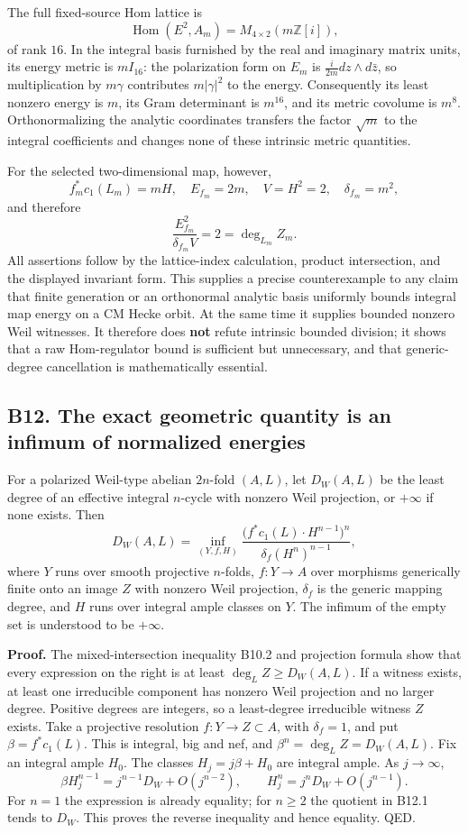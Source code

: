 The full fixed-source Hom lattice is \[
 \operatorname{Hom}(E^2,A_m)=M_{4\times2}(m\mathbb Z[i]),
\] of rank \(16\). In the integral basis furnished by the real and imaginary matrix units, its energy metric is \(m I_{16}\): the polarization form on \(E_m\) is \(\frac{i}{2m}dz\wedge d\bar z\), so multiplication by \(m\gamma\) contributes \(m|\gamma|^2\) to the energy. Consequently its least nonzero energy is \(m\), its Gram determinant is \(m^{16}\), and its metric covolume is \(m^8\). Orthonormalizing the analytic coordinates transfers the factor \(\sqrt m\) to the integral coefficients and changes none of these intrinsic metric quantities.

For the selected two-dimensional map, however, \[
 f_m^*c_1(L_m)=mH,\quad
 E_{f_m}=2m,\quad V=H^2=2,\quad \delta_{f_m}=m^2,
\] and therefore \[
 \frac{E_{f_m}^2}{\delta_{f_m}V}=2=\deg_{L_m}Z_m.
\] All assertions follow by the lattice-index calculation, product intersection, and the displayed invariant form. This supplies a precise counterexample to any claim that finite generation or an orthonormal analytic basis uniformly bounds integral map energy on a CM Hecke orbit. At the same time it supplies bounded nonzero Weil witnesses. It therefore does \textbf{not} refute intrinsic bounded division; it shows that a raw Hom-regulator bound is sufficient but unnecessary, and that generic-degree cancellation is mathematically essential.

\subsection{B12. The exact geometric quantity is an infimum of normalized energies}\label{b12.-the-exact-geometric-quantity-is-an-infimum-of-normalized-energies}

For a polarized Weil-type abelian \(2n\)-fold \((A,L)\), let \(D_W(A,L)\) be the least degree of an effective integral \(n\)-cycle with nonzero Weil projection, or \(+\infty\) if none exists. Then \[
 D_W(A,L)=\inf_{(Y,f,H)}
 \frac{\bigl(f^*c_1(L)\cdot H^{n-1}\bigr)^n}
 {\delta_f (H^n)^{n-1}},
\tag{B12.1}
\] where \(Y\) runs over smooth projective \(n\)-folds, \(f:Y\to A\) over morphisms generically finite onto an image \(Z\) with nonzero Weil projection, \(\delta_f\) is the generic mapping degree, and \(H\) runs over integral ample classes on \(Y\). The infimum of the empty set is understood to be \(+\infty\).

\textbf{Proof.} The mixed-intersection inequality B10.2 and projection formula show that every expression on the right is at least \(\deg_L Z\ge D_W(A,L)\). If a witness exists, at least one irreducible component has nonzero Weil projection and no larger degree. Positive degrees are integers, so a least-degree irreducible witness \(Z\) exists. Take a projective resolution \(f:Y\to Z\subset A\), with \(\delta_f=1\), and put \(\beta=f^*c_1(L)\). This is integral, big and nef, and \(\beta^n=\deg_L Z=D_W(A,L)\). Fix an integral ample \(H_0\). The classes \(H_j=j\beta+H_0\) are integral ample. As \(j\to\infty\), \[
 \beta H_j^{n-1}=j^{n-1}D_W+O(j^{n-2}),\qquad
 H_j^n=j^nD_W+O(j^{n-1}).
\] For \(n=1\) the expression is already equality; for \(n\ge2\) the quotient in B12.1 tends to \(D_W\). This proves the reverse inequality and hence equality. QED.

